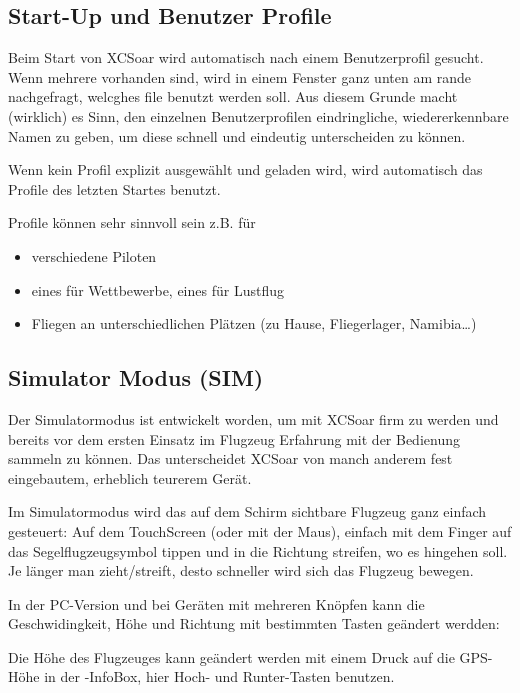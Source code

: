 \subsection*{Start-Up und Benutzer Profile}
Beim Start von {\textsf  XCSoar} wird automatisch nach einem Benutzerprofil gesucht. Wenn mehrere vorhanden sind, wird in einem Fenster ganz unten am rande nachgefragt, welcghes file benutzt werden soll.
Aus diesem Grunde macht (wirklich) es Sinn, den einzelnen Benutzerprofilen eindringliche, wiedererkennbare Namen zu geben, 
um diese schnell und eindeutig unterscheiden zu können. 

Wenn kein Profil explizit ausgewählt und geladen wird, wird automatisch das Profile des letzten Startes benutzt. 

Profile können sehr sinnvoll sein z.B. für  

\begin{itemize}
\item verschiedene Piloten
\item eines für Wettbewerbe, eines für Lustflug
\item Fliegen an unterschiedlichen Plätzen (zu Hause, Fliegerlager, Namibia\dots )
\end{itemize}


\subsection*{Simulator Modus (SIM)}
Der Simulatormodus ist entwickelt worden, um mit {\textsf  XCSoar} firm zu werden und bereits vor dem ersten Einsatz im Flugzeug 
Erfahrung mit der Bedienung sammeln zu können. Das unterscheidet {\textsf  XCSoar} von manch anderem fest eingebautem, erheblich teurerem 
 Gerät. 

Im Simulatormodus wird das auf dem Schirm sichtbare Flugzeug ganz einfach gesteuert:
Auf dem TouchScreen (oder mit der Maus), einfach mit dem Finger auf das Segelflugzeugsymbol tippen und in die Richtung 
streifen, wo es hingehen soll. Je länger man zieht/streift, desto schneller wird sich das Flugzeug bewegen. 

In der PC-Version und bei Geräten mit mehreren Knöpfen kann die Geschwidingkeit, Höhe und Richtung mit bestimmten Tasten geändert werdden: 



Die Höhe des Flugzeuges kann geändert werden mit einem Druck auf die GPS-Höhe in der -InfoBox, hier Hoch- und Runter-Tasten benutzen. 


